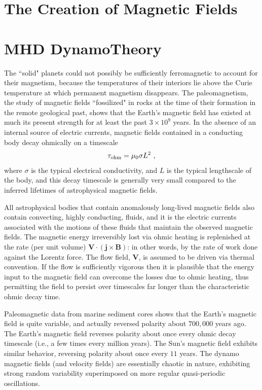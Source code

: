 \documentclass[12pt,a4paper]{article}
\renewcommand{\vec}[1]{\boldsymbol{#1}}
\begin{document}
\section{The Creation of Magnetic Fields}
\cite{2015bps..book.....C} 

\section{MHD DynamoTheory}
\cite{Plasma2014} The ``solid" planets could not possibly be sufficiently ferromagnetic to account for their magnetism, because the temperatures of their interiors lie above the Curie temperature at which permanent magnetism disappears. The paleomagnetism, the study of magnetic fields ``fossilized" in rocks at the time of their formation in the remote geological past, shows that the Earth's magnetic field has existed at much its present strength for at least the past $3 \times 10^9$ years. In the absence of an internal source of electric currents, magnetic fields contained in a conducting body decay ohmically on a timescale
\begin{equation}
\tau_{\rm ohm} = \mu_0 \sigma L^2 ~,
\end{equation}
where $\sigma$ is the typical electrical conductivity, and $L$ is the typical lengthscale of the body, and this decay timescale is generally very small compared to the inferred lifetimes of astrophysical magnetic fields. 

All astrophysical bodies that contain anomalously long-lived magnetic fields also contain convecting, highly conducting, fluids, and it is the electric currents associated with the motions of these fluids that maintain the observed magnetic fields. The magnetic energy irreversibly lost via ohmic heating is replenished at the rate (per unit volume) $\vec{V} \cdot (\vec{j} \times \vec{B})$: in other words, by the rate of work done against the Lorentz force. The flow field, $\vec{V}$, is assumed to be driven via thermal convention. If the flow is sufficiently vigorous then it is plausible that the energy input to the magnetic field can overcome the losses due to ohmic heating, thus permitting the field to persist over timescales far longer than the characteristic ohmic decay time.

Paleomagnetic data from marine sediment cores shows that the Earth's magnetic field is quite variable, and actually reversed polarity about $700, 000$ years ago. The Earth's magnetic field reverses polarity about once every ohmic decay timescale (i.e., a few times every million years). The Sun's magnetic field exhibits similar behavior, reversing polarity about once every $11$ years. The dynamo magnetic fields (and velocity fields) are essentially chaotic in nature, exhibiting strong random variability superimposed on more regular quasi-periodic oscillations.
\end{document}
